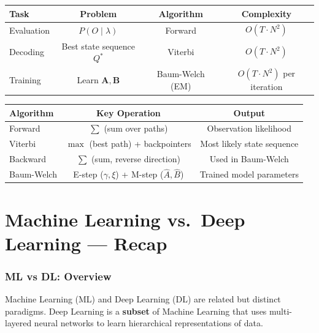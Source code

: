 \documentclass[11pt,a4paper]{article}
\theoremstyle{definition}
\theoremstyle{plain}
\theoremstyle{remark}
\begin{document}
\begin{center}
\renewcommand{\arraystretch}{1.4}
\begin{tabular}{|l|c|c|c|}
\hline
\textbf{Task} & \textbf{Problem} & \textbf{Algorithm} & \textbf{Complexity} \\
\hline
Evaluation & $P(O \mid \lambda)$ & Forward & $O(T \cdot N^2)$ \\
\hline
Decoding & Best state sequence $Q^*$ & Viterbi & $O(T \cdot N^2)$ \\
\hline
Training & Learn $\mathbf{A}, \mathbf{B}$ & Baum-Welch (EM) & $O(T \cdot N^2)$ per iteration \\
\hline
\end{tabular}
\end{center}

\vspace{0.5em}

\begin{center}
\renewcommand{\arraystretch}{1.4}
\begin{tabular}{|l|c|c|}
\hline
\textbf{Algorithm} & \textbf{Key Operation} & \textbf{Output} \\
\hline
Forward & $\sum$ (sum over paths) & Observation likelihood \\
\hline
Viterbi & $\max$ (best path) + backpointers & Most likely state sequence \\
\hline
Backward & $\sum$ (sum, reverse direction) & Used in Baum-Welch \\
\hline
Baum-Welch & E-step ($\gamma, \xi$) + M-step ($\hat{A}, \hat{B}$) & Trained model parameters \\
\hline
\end{tabular}
\end{center}

\newpage
\part{Machine Learning vs.\ Deep Learning --- Recap}

\section{ML vs DL: Overview}

Machine Learning (ML) and Deep Learning (DL) are related but distinct paradigms. Deep Learning is a \textbf{subset} of Machine Learning that uses multi-layered neural networks to learn hierarchical representations of data.
\end{document}
